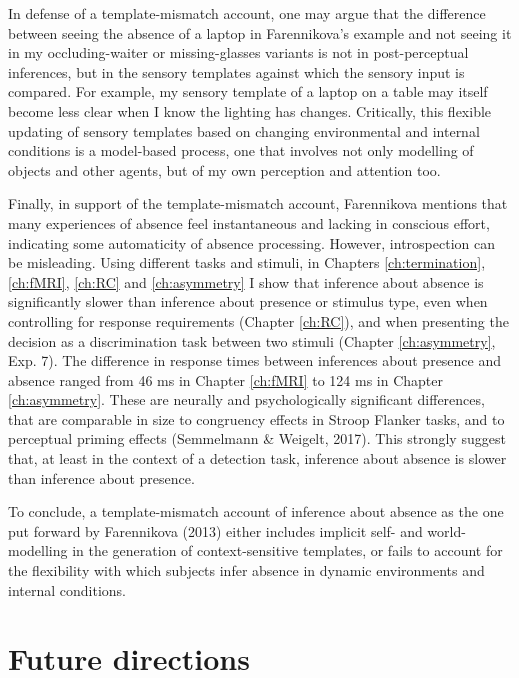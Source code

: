 \documentclass[12pt,twoside]{reedthesis}
\begin{document}
In defense of a template-mismatch account, one may argue that the difference between seeing the absence of a laptop in Farennikova's example and not seeing it in my occluding-waiter or missing-glasses variants is not in post-perceptual inferences, but in the sensory templates against which the sensory input is compared. For example, my sensory template of a laptop on a table may itself become less clear when I know the lighting has changes. Critically, this flexible updating of sensory templates based on changing environmental and internal conditions is a model-based process, one that involves not only modelling of objects and other agents, but of my own perception and attention too.

Finally, in support of the template-mismatch account, Farennikova mentions that many experiences of absence feel instantaneous and lacking in conscious effort, indicating some automaticity of absence processing. However, introspection can be misleading. Using different tasks and stimuli, in Chapters \ref{ch:termination}, \ref{ch:fMRI}, \ref{ch:RC} and \ref{ch:asymmetry} I show that inference about absence is significantly slower than inference about presence or stimulus type, even when controlling for response requirements (Chapter \ref{ch:RC}), and when presenting the decision as a discrimination task between two stimuli (Chapter \ref{ch:asymmetry}, Exp. 7). The difference in response times between inferences about presence and absence ranged from 46 ms in Chapter \ref{ch:fMRI} to 124 ms in Chapter \ref{ch:asymmetry}. These are neurally and psychologically significant differences, that are comparable in size to congruency effects in Stroop Flanker tasks, and to perceptual priming effects (Semmelmann \& Weigelt, 2017). This strongly suggest that, at least in the context of a detection task, inference about absence is slower than inference about presence.

To conclude, a template-mismatch account of inference about absence as the one put forward by Farennikova (2013) either includes implicit self- and world-modelling in the generation of context-sensitive templates, or fails to account for the flexibility with which subjects infer absence in dynamic environments and internal conditions.

\hypertarget{future-directions}{%
\section*{Future directions}\label{future-directions}}
\end{document}
